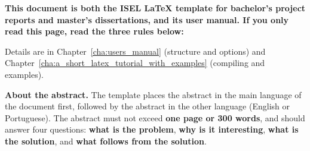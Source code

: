 \textbf{This document is both the ISEL \LaTeX{} template for bachelor's project reports and master's dissertations, and its user manual. If you only read this page, read the three rules below:}

\bigskip
\noindent%

\bigskip
Details are in Chapter~\ref{cha:users_manual} (structure and options) and Chapter~\ref{cha:a_short_latex_tutorial_with_examples} (compiling and examples).

\textbf{About the abstract.} The template places the abstract in the main language of the document first, followed by the abstract in the other language (English or Portuguese). The abstract must not exceed \textbf{one page or 300 words}, and should answer four questions: \textbf{what is the problem}, \textbf{why is it interesting}, \textbf{what is the solution}, and \textbf{what follows from the solution}.

\printkeywords